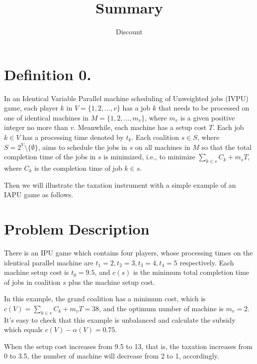 \documentclass[UTF8]{article}
\title{Summary}
\author{Dis\cdot count}
\begin{document}
\maketitle{}





%



\section*{Definition 0.}
In an Identical Variable Parallel machine scheduling of Unweighted jobs (IVPU) game, each player $k$ in $V=\{1,2,\ldots,v\}$ has a job $k$ that needs to be processed on one of identical machines in $M=\{1,2,\ldots,m_v\}$, where $m_v$ is a given positive integer no more than $v$. Meanwhile, each machine has a setup cost $T$. Each job $k\in V$ has a processing time denoted by $t_k$. Each coalition $s \in S$, where $S=2^V\setminus\{\emptyset\}$, aims to schedule the jobs in $s$ on all machines in $M$ so that the total completion  time of the jobs in $s$ is minimized, i.e., to minimize $\sum_{k\in s}{C_k}+m_sT $,
where $C_k$ is the completion time of job $k\in s$.


Then we will illustrate the taxation instrument with a simple example of an IAPU game as follows.

\section*{Problem Description}

There is an IPU game which contains four players, whose processing times on the identical parallel machine are $t_1=2, t_2=3, t_3=4, t_4=5$ respectively. Each machine setup cost is $t_0=9.5$, and $c(s)$ is the minimum total completion time of jobs in coalition $s$ plus the machine setup cost.

In this example, the grand coalition has a minimum cost, which is $c(V) = \sum_{k\in v}{C_k}+m_vT = 38$, and the optimum number of machine is $m_v = 2$.
It's easy to check that this example is unbalanced and calculate the subsidy which equals $c(V) - \alpha(V) = 0.75$.

When the setup cost increases from 9.5 to 13, that is, the taxation increases from 0 to 3.5,
the number of machine will decrease from 2 to 1, accordingly.
\end{document}
